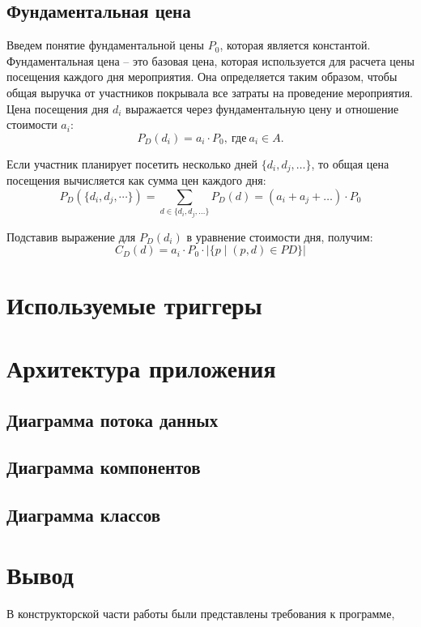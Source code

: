 \subsection{Фундаментальная цена}

Введем понятие фундаментальной цены $P_0$, которая является константой. Фундаментальная цена -- это базовая цена, которая используется для расчета цены посещения каждого дня мероприятия. Она определяется таким образом, чтобы общая выручка от участников покрывала все затраты на проведение мероприятия. Цена посещения дня $d_i$ выражается через фундаментальную цену и отношение стоимости $a_i$:  
\begin{equation}
	P_D(d_i) = a_i \cdot P_0, \ \text{где} \ a_i \in A.
\end{equation}

Если участник планирует посетить несколько дней $\{d_i, d_j, \dots\}$, то общая цена посещения вычисляется как сумма цен каждого дня:  
\begin{equation}
	P_D(\{d_i, d_j, \cdots\}) = \sum_{d \in \{d_i, d_j, \dots\}}P_D(d) = (a_i + a_j + \dots) \cdot P_0
\end{equation}

Подставив выражение для $P_D(d_i)$ в уравнение стоимости дня, получим:
\begin{equation}
	C_D(d) = a_i \cdot P_0 \cdot |\{p \mid (p, d) \in PD\}|
\end{equation}

\section{Используемые триггеры}

\section{Архитектура приложения}

\subsection{Диаграмма потока данных}

\subsection{Диаграмма компонентов}

\subsection{Диаграмма классов}


\section{Вывод}

В конструкторской части работы были представлены требования к программе, 

\clearpage
